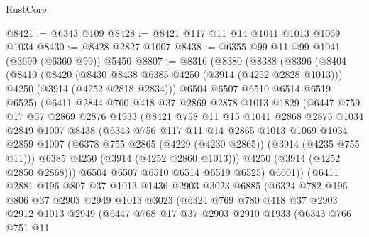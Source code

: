 \begin{lexlean}{RustCore}
\begin{coremodule}
@8421 := @6343 @109
@8428 := @8421 @117 @11 @14 @1041 @1013 @1069 @1034
@8430 := @8428 @2827 @1007
@8438 := @6355 @99 @11 @99 @1041 (@3699 (@6360 @99)) @5450
@8807 := @8316
    (@8380
      (@8388
        (@8396
          (@8404
            (@8410
              (@8420
                (@8430 @8438 @6385 @4250 (@3914 (@4252 @2828 @1013)))
                @4250
                (@3914 (@4252 @2818 @2834)))
              @6504
              @6507
              @6510
              @6514
              @6519
              @6525)
            (@6411
              @2844
              @760
              @418
              @37
              @2869
              @2878
              @1013
              @1829
              (@6447
                @759
                @17
                @37
                @2869
                @2876
                @1933
                (@8421
                  @758
                  @11
                  @15
                  @1041
                  @2868
                  @2875
                  @1034
                  @2849
                  @1007
                  @8438
                  (@6343
                    @756
                    @117
                    @11
                    @14
                    @2865
                    @1013
                    @1069
                    @1034
                    @2859
                    @1007
                    (@6378 @755 @2865 (@4229 (@4230 @2865)) (@3914 (@4235 @755 @11)))
                    @6385
                    @4250
                    (@3914 (@4252 @2860 @1013)))
                  @4250
                  (@3914 (@4252 @2850 @2868)))
                @6504
                @6507
                @6510
                @6514
                @6519
                @6525)
              @6601))
          (@6411
            @2881
            @196
            @807
            @37
            @1013
            @1436
            @2903
            @3023
            @6885
            (@6324
              @782
              @196
              @806
              @37
              @2903
              @2949
              @1013
              @3023
              (@6324
                @769
                @780
                @418
                @37
                @2903
                @2912
                @1013
                @2949
                (@6447
                  @768
                  @17
                  @37
                  @2903
                  @2910
                  @1933
                  (@6343
                    @766
                    @751
                    @11

\end{coremodule}
\end{lexlean}
